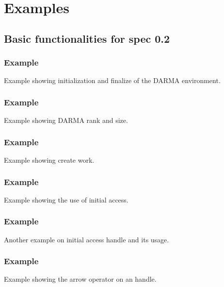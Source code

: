
\appendix


\chapter{Examples}
\label{chap:examples}


\section{Basic functionalities for spec 0.2}

\subsection{Example}
Example showing initialization and finalize of the DARMA environment.


\subsection{Example}
Example showing DARMA rank and size.


\subsection{Example}
Example showing create work.


\subsection{Example}
Example showing the use of initial access.


\subsection{Example}
Another example on initial access handle and its usage.


\subsection{Example}
Example showing the arrow operator on an handle.


